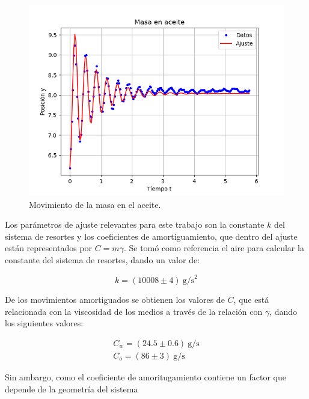 \documentclass[final,5p,times,twocolumn, nopreprintline]{elsarticle}
\numberwithin{equation}{section}
\begin{document}
\begin{figure}[h!]
\begin{center}
\includegraphics[width=\columnwidth]{../aceite.png} 
\end{center}
\caption{Movimiento de la masa en el aceite.}
\end{figure}\label{fig4.3}

Los parámetros de ajuste relevantes para este trabajo son la constante $k$ del sistema de resortes y los coeficientes de amortiguamiento, que dentro del ajuste están representados por $C=m\gamma$. Se tomó como referencia el aire para calcular la constante del sistema de resortes, dando un valor de:

\begin{equation}
k=(10008\pm 4)~\text{g/s}^2
\end{equation}\label{eq4.1}

De los movimientos amortiguados se obtienen los valores de $C$, que está relacionada con la viscosidad de los medios a través de la relación con $\gamma$, dando los siguientes valores:

\begin{align}
C_w = (24.5\pm0.6)~\text{g/s}\\
C_o = (86\pm3)~\text{g/s}
\end{align}\label{eq4.2}

Sin ambargo, como el coeficiente de amoritugamiento contiene un factor que depende de la geometría del sistema

 







\end{document}
